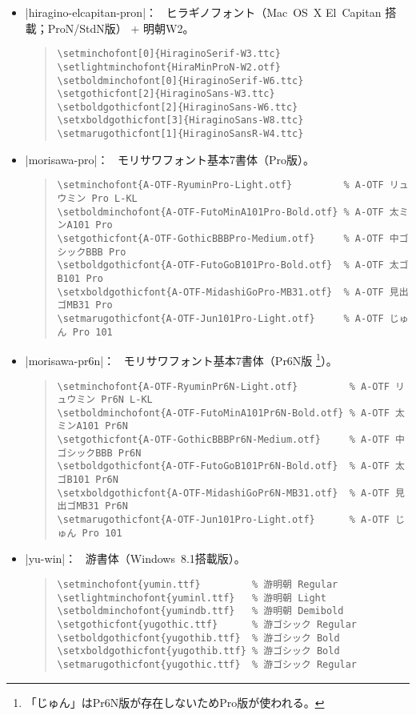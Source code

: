 \documentclass[uplatex,dvipdfmx,a4paper]{jsarticle}
\newcommand{\Means}{：\ }
\begin{document}
\begin{itemize}
\item |hiragino-elcapitan-pron|\Means
  ヒラギノフォント（Mac~OS~X El~Capitan 搭載；ProN/StdN版） + 明朝W2。
\begin{quote}\small\begin{verbatim}
\setminchofont[0]{HiraginoSerif-W3.ttc}
\setlightminchofont{HiraMinProN-W2.otf}
\setboldminchofont[0]{HiraginoSerif-W6.ttc}
\setgothicfont[2]{HiraginoSans-W3.ttc}
\setboldgothicfont[2]{HiraginoSans-W6.ttc}
\setxboldgothicfont[3]{HiraginoSans-W8.ttc}
\setmarugothicfont[1]{HiraginoSansR-W4.ttc}
\end{verbatim}\end{quote}

\item |morisawa-pro|\Means
  モリサワフォント基本7書体（Pro版）。
\begin{quote}\small\begin{verbatim}
\setminchofont{A-OTF-RyuminPro-Light.otf}         % A-OTF リュウミン Pro L-KL
\setboldminchofont{A-OTF-FutoMinA101Pro-Bold.otf} % A-OTF 太ミンA101 Pro
\setgothicfont{A-OTF-GothicBBBPro-Medium.otf}     % A-OTF 中ゴシックBBB Pro
\setboldgothicfont{A-OTF-FutoGoB101Pro-Bold.otf}  % A-OTF 太ゴB101 Pro
\setxboldgothicfont{A-OTF-MidashiGoPro-MB31.otf}  % A-OTF 見出ゴMB31 Pro
\setmarugothicfont{A-OTF-Jun101Pro-Light.otf}     % A-OTF じゅん Pro 101
\end{verbatim}\end{quote}

\item |morisawa-pr6n|\Means
  モリサワフォント基本7書体（Pr6N版
  \footnote{「じゅん」はPr6N版が存在しないためPro版が使われる。}）。
\begin{quote}\small\begin{verbatim}
\setminchofont{A-OTF-RyuminPr6N-Light.otf}         % A-OTF リュウミン Pr6N L-KL
\setboldminchofont{A-OTF-FutoMinA101Pr6N-Bold.otf} % A-OTF 太ミンA101 Pr6N
\setgothicfont{A-OTF-GothicBBBPr6N-Medium.otf}     % A-OTF 中ゴシックBBB Pr6N
\setboldgothicfont{A-OTF-FutoGoB101Pr6N-Bold.otf}  % A-OTF 太ゴB101 Pr6N
\setxboldgothicfont{A-OTF-MidashiGoPr6N-MB31.otf}  % A-OTF 見出ゴMB31 Pr6N
\setmarugothicfont{A-OTF-Jun101Pro-Light.otf}      % A-OTF じゅん Pro 101
\end{verbatim}\end{quote}

\item |yu-win|\Means
  游書体（Windows~8.1搭載版）。
\begin{quote}\small\begin{verbatim}
\setminchofont{yumin.ttf}         % 游明朝 Regular
\setlightminchofont{yuminl.ttf}   % 游明朝 Light
\setboldminchofont{yumindb.ttf}   % 游明朝 Demibold
\setgothicfont{yugothic.ttf}      % 游ゴシック Regular
\setboldgothicfont{yugothib.ttf}  % 游ゴシック Bold
\setxboldgothicfont{yugothib.ttf} % 游ゴシック Bold
\setmarugothicfont{yugothic.ttf}  % 游ゴシック Regular
\end{verbatim}\end{quote}


\end{itemize}
\end{document}
